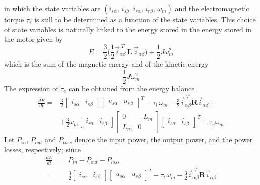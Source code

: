 \documentclass[11pt,a4paper,oneside]{book}
\numberwithin{equation}{section}
\theoremstyle{it}
\theoremstyle{definition}
\begin{document}
in which the state variables are $(i_{s\alpha},\,i_{s\beta}, 
i_{r\alpha},\,i_{r\beta},\,\omega_m)$ and the electromagnetic torque $\tau_e$ 
is still to be determined as a function of the state variables. This choice of 
state variables is naturally linked to the energy stored in the energy stored 
in the motor given by
\begin{equation}\label{im_eq_25}
	E = \frac{3}{2}\Bigg(\frac{1}{2} \vec{i}_{\alpha\beta}^{\,\,T} 
	\,\mathbf{L}\, \vec{i}_{\alpha\beta} \Bigg)+\frac{1}{2}J\omega_m^2
\end{equation}
which is the sum of the magnetic energy and of the kinetic energy
\begin{equation}\label{im_eq_26}
	\frac{1}{2}J\omega_m^2
\end{equation}
The expression of $\tau_e$ can be obtained from the energy balance
\begin{equation}\label{im_eq_27}
	\begin{aligned}
		\frac{dE}{dt} = &
		\frac{3}{2}\left[\begin{matrix}
			i_{s\alpha} & i_{s\beta}
		\end{matrix}\right]
		\left[\begin{matrix}
			u_{s\alpha} & u_{s\beta}
		\end{matrix}\right]^T 
		-\tau_l\,\omega_m-\frac{3}{2}\vec{i}_{\alpha\beta}^{\,\,T}\mathbf{R}\vec{i}_{\alpha\beta}
		+ \\[6pt]
		& + \frac{3}{2}\omega_m
		\left[\begin{matrix}
			i_{r\alpha} & i_{r\beta}
		\end{matrix}\right]
		\left[\begin{matrix}
			0 & -L_m \\
			L_m & 0
		\end{matrix}\right]
		\left[\begin{matrix}
			i_{s\alpha} & i_{s\beta}
		\end{matrix}\right]^T
		+\tau_e\omega_m
	\end{aligned}
\end{equation}
Let $P_{in}$, $P_{out}$ and $P_{loss}$ denote the input power, the output 
power, and the power losses, respectively; since
\begin{equation}\label{im_eq_28}
	\begin{aligned}
		\frac{dE}{dt} = & P_{in} - P_{out} -P_{loss} \\[6pt]
		= &
		\frac{3}{2}\left[\begin{matrix}
			i_{s\alpha} & i_{s\beta}
		\end{matrix}\right]
		\left[\begin{matrix}
			u_{s\alpha} & u_{s\beta}
		\end{matrix}\right]^T 
		-\tau_l\,\omega_m-\frac{3}{2}\vec{i}_{\alpha\beta}^{\,\,T}\mathbf{R}\vec{i}_{\alpha\beta}
	\end{aligned}
\end{equation}
\end{document}
